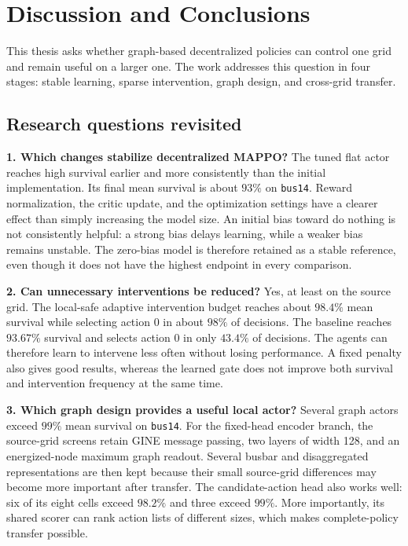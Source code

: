 \begingroup
\color{black}

\chapter{Discussion and Conclusions}
\label{ch:discussion-conclusion}

This thesis asks whether graph-based decentralized policies can control one
grid and remain useful on a larger one. The work addresses this question in
four stages: stable learning, sparse intervention, graph design, and
cross-grid transfer.

\section{Research questions revisited}

\noindent\textbf{1. Which changes stabilize decentralized MAPPO?}
The tuned flat actor reaches high survival earlier and more consistently than
the initial implementation. Its final mean survival is about $93\%$ on
\texttt{bus14}. Reward normalization, the critic update, and the optimization
settings have a clearer effect than simply increasing the model size. An
initial bias toward do nothing is not consistently helpful: a strong bias
delays learning, while a weaker bias remains unstable. The zero-bias model is
therefore retained as a stable reference, even though it does not have the
highest endpoint in every comparison.

\medskip
\noindent\textbf{2. Can unnecessary interventions be reduced?}
Yes, at least on the source grid. The local-safe adaptive intervention budget
reaches about $98.4\%$ mean survival while selecting action 0 in about $98\%$
of decisions. The baseline reaches $93.67\%$ survival and selects action 0 in
only $43.4\%$ of decisions. The agents can therefore learn to intervene less
often without losing performance. A fixed penalty also gives good results,
whereas the learned gate does not improve both survival and intervention
frequency at the same time.

\medskip
\noindent\textbf{3. Which graph design provides a useful local actor?}
Several graph actors exceed $99\%$ mean survival on \texttt{bus14}. For the
fixed-head encoder branch, the source-grid screens retain GINE message passing,
two layers of width 128, and an energized-node maximum graph readout. Several
busbar and disaggregated representations are then kept because their small
source-grid differences may become more important after transfer. The
candidate-action head also works well: six of its eight cells exceed $98.2\%$
and three exceed $99\%$. More importantly, its shared scorer can rank action
lists of different sizes, which makes complete-policy transfer possible.

